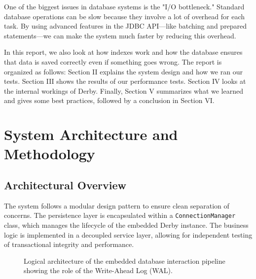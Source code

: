 \documentclass[journal]{IEEEtran}
\begin{document}
One of the biggest issues in database systems is the "I/O bottleneck." Standard database operations can be slow because they involve a lot of overhead for each task. By using advanced features in the JDBC API—like batching and prepared statements—we can make the system much faster by reducing this overhead.

In this report, we also look at how indexes work and how the database ensures that data is saved correctly even if something goes wrong. The report is organized as follows: Section II explains the system design and how we ran our tests. Section III shows the results of our performance tests. Section IV looks at the internal workings of Derby. Finally, Section V summarizes what we learned and gives some best practices, followed by a conclusion in Section VI.

\section{System Architecture and Methodology}

\subsection{Architectural Overview}
The system follows a modular design pattern to ensure clean separation of concerns. The persistence layer is encapsulated within a \texttt{ConnectionManager} class, which manages the lifecycle of the embedded Derby instance. The business logic is implemented in a decoupled service layer, allowing for independent testing of transactional integrity and performance.

\begin{figure}[!h]
\centering
{}
\caption{Logical architecture of the embedded database interaction pipeline showing the role of the Write-Ahead Log (WAL).}
\label{fig_arch}
\end{figure}
\end{document}
